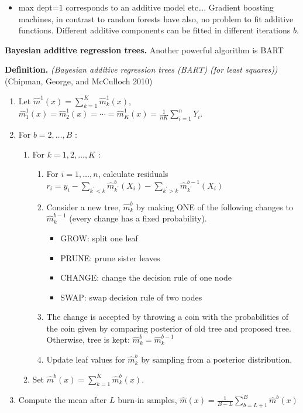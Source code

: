 \documentclass[
]{book}
\providecommand{\tightlist}{%
  \setlength{\itemsep}{0pt}\setlength{\parskip}{0pt}}
\begin{document}
\begin{itemize}
\tightlist
\item
  max dept=\(1\) corresponds to an additive model etc\ldots.
  Gradient boosting machines, in contrast to random forests have also, no problem to fit additive functions. Different additive components can be fitted in different iterations \(b\).
\end{itemize}

\textbf{Bayesian additive regression trees.} Another powerful algorithm is BART

\textbf{Definition.} \emph{(Bayesian additive regression trees (BART) (for least squares))} (Chipman, George, and McCulloch 2010)

\begin{enumerate}
\def\labelenumi{\arabic{enumi}.}
\tightlist
\item
  Let \(\hat{m}^1(x)=\sum_{k=1}^K \hat{m}_k^1(x)\), \(\hat{m}_1^1(x)=\hat{m}_2^1(x)=\cdots=\hat{m}_K^1(x)=\frac{1}{n K} \sum_{i=1}^n Y_i\).
\item
  For \(b=2, \ldots, B\) :

  \begin{enumerate}
  \def\labelenumii{(\alph{enumii})}
  \tightlist
  \item
    For \(k=1,2, \ldots, K\) :

    \begin{enumerate}
    \def\labelenumiii{\roman{enumiii}.}
    \tightlist
    \item
      For \(i=1, \ldots, n\), calculate residuals
      \(r_i=y_i-\sum_{k^{\prime}<k} \hat{m}_{k^{\prime}}^b\left(X_i\right)-\sum_{k^{\prime}>k} \hat{m}_{k^{\prime}}^{b-1}\left(X_i\right)\)
    \item
      Consider a new tree, \(\hat{m}_k^b\) by making ONE of the following changes to \(\hat{m}_k^{b-1}\) (every change has a fixed probability).

      \begin{itemize}
      \tightlist
      \item
        GROW: split one leaf
      \item
        PRUNE: prune sister leaves
      \item
        CHANGE: change the decision rule of one node
      \item
        SWAP: swap decision rule of two nodes
      \end{itemize}
    \item
      The change is accepted by throwing a coin with the probabilities of the coin given by comparing posterior of old tree and proposed tree. Otherwise, tree is kept: \(\hat{m}_k^{b}=\hat{m}_k^{b-1}\)
    \item
      Update leaf values for \(\hat{m}_k^{b}\) by sampling from a posterior distribution.
    \end{enumerate}
  \item
    Set \(\hat{m}^b(x)=\sum_{k=1}^K \hat{m}_k^b(x)\).
  \end{enumerate}
\item
  Compute the mean after \(L\) burn-in samples,
  \(\hat{m}(x)=\frac{1}{B-L} \sum_{b=L+1}^B \hat{m}^b(x)\)
\end{enumerate}
\end{document}
